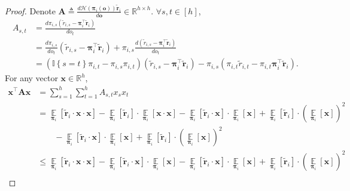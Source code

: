 \documentclass[10pt]{article}
\def\rvo{{\mathbf{o}}}
\def\rvx{{\mathbf{x}}}
\def\rvo{{\mathbf{o}}}
\def\rvtilder{{\tilde{\mathbf{r}}}}
\def\rvpi{{\boldsymbol{\pi}}}
\def\rmA{{\mathbf{A}}}
\def\sE{{\mathbb{E}}}
\def\sR{{\mathbb{R}}}
\def\sI{{\mathbb{I}}}
\def\gH{{\mathcal{H}}}
\DeclareMathOperator*{\expectation}{\sE}
\begin{document}
\begin{proof}
    Denote $\rmA \triangleq \frac{d \gH\left( \rvpi_i \left(\rvo \right) \right) \rvtilder_i}{d \rvo } \in \sR^{h \times h}$. $\forall s, t \in [h]$,
\begin{equation*}
\begin{split}
    A_{s, t} &= \frac{d \pi_{i,s} \left( \tilde{r}_{i,s} - \rvpi_i^\top \rvtilder_i \right) }{d o_{t}} \\
    &= \frac{d \pi_{i,s} }{d o_{t}} \left( \tilde{r}_{i,s} - \rvpi_i^\top \rvtilder_i \right) + \pi_{i,s} \frac{d \left( \tilde{r}_{i,s} - \rvpi_i^\top \rvtilder_i \right) }{d o_{t}} \\
    &=\left ( \sI\left\{ s = t\right\} \pi_{i,t} -  \pi_{i,s } \pi_{i,t} \right) \left( \tilde{r}_{i,s} - \rvpi_i^\top \rvtilder_i \right) - \pi_{i,s} \left( \pi_{i,t} \tilde{r}_{i,t} - \pi_{i,t} \rvpi_i^\top \rvtilder_i \right).
\end{split}
\end{equation*}
For any vector $\rvx \in \sR^h$, 
\begin{equation*}
\begin{split}
    \rvx^\top \rmA \rvx &= \sum\limits_{s=1}^{h}{ \sum\limits_{t=1}^{h}{ A_{s,t} x_s x_t} } \\
    &= \expectation\limits_{\rvpi_i}\left[ \rvtilder_i \cdot \rvx \cdot \rvx \right] - \expectation\limits_{\rvpi_i}\left[ \rvtilder_i \right] \cdot \expectation\limits_{\rvpi_i}\left[ \rvx \cdot \rvx \right] - \expectation\limits_{\rvpi_i}\left[ \rvtilder_i \cdot \rvx \right] \cdot \expectation\limits_{\rvpi_i}\left[ \rvx \right] + \expectation\limits_{\rvpi_i}\left[ \rvtilder_i \right] \cdot \left( \expectation\limits_{\rvpi_i}\left[ \rvx \right] \right)^2 \\
    &\qquad - \expectation\limits_{\rvpi_i}\left[ \rvtilder_i \cdot \rvx \right] \cdot \expectation\limits_{\rvpi_i}\left[ \rvx \right] + \expectation\limits_{\rvpi_i}\left[ \rvtilder_i \right] \cdot \left( \expectation\limits_{\rvpi_i}\left[ \rvx \right] \right)^2 \\
    &\le \expectation\limits_{\rvpi_i}\left[ \rvtilder_i \cdot \rvx \cdot \rvx \right] - \expectation\limits_{\rvpi_i}\left[ \rvtilder_i \cdot \rvx \right] \cdot \expectation\limits_{\rvpi_i}\left[ \rvx \right] - \expectation\limits_{\rvpi_i}\left[ \rvtilder_i \cdot \rvx \right] \cdot \expectation\limits_{\rvpi_i}\left[ \rvx \right] + \expectation\limits_{\rvpi_i}\left[ \rvtilder_i \right] \cdot \left( \expectation\limits_{\rvpi_i}\left[ \rvx \right] \right)^2 \\

\end{split}
\end{equation*}
\end{proof}
\end{document}
